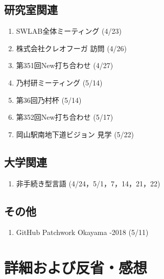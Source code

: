 \documentclass[fleqn, 14pt]{extarticle}
\begin{document}
\subsection{研究室関連}
\label{sec2-2}
\begin{enumerate}
\item SWLAB全体ミーティング
  \hfill
  \label{sec2-2-enum1}
  (4/23)
\item 株式会社クレオフーガ 訪問
  \hfill
  \label{sec2-2-enum2}
  (4/26)
\item 第351回New打ち合わせ
  \hfill
  \label{sec2-2-enum3}
  (4/27)
\item 乃村研ミーティング
  \hfill
  \label{sec2-2-enum4}
  (5/14)
\item 第36回乃村杯
  \hfill
  \label{sec2-2-enum5}
  (5/14)
\item 第352回New打ち合わせ
  \hfill
  \label{sec2-2-enum6}
  (5/17)
\item 岡山駅南地下道ビジョン 見学
  \hfill
  \label{sec2-2-enum7}
  (5/22)
\end{enumerate}

\subsection{大学関連}
\label{sec2-3}
\begin{enumerate}
\item 非手続き型言語
  \hfill
  \label{sec2-3-enum1}
  (4/24，5/1，7，14，21，22)
\end{enumerate}

\subsection{その他}
\label{sec2-4}
\begin{enumerate}
\item GitHub Patchwork Okayama -2018
  \hfill
  \label{sec2-4-enum1}
  (5/11)
\end{enumerate}

\section{詳細および反省・感想}
\label{sec3}
\end{document}
